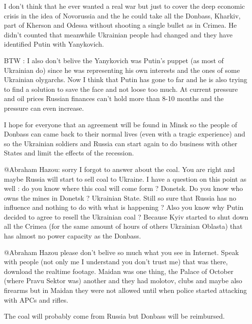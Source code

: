 \begin{itemize}
\begin{itemize}
I don't think that he ever wanted a real war but just to cover the deep
economic crisis in the idea of Novorussia and the he could take all the
Donbass, Kharkiv, part of Kherson and Odessa without shooting a single bullet
as in Crimea. He didn't counted that meanwhile Ukrainian people had changed and
they have identified Putin with Yanykovich.

BTW : I also don't belive the Yanykovich was Putin's puppet (as most of
Ukrainian do) since he was representing his own interests and the ones of some
Ukrainian olygarchs. Now I think that Putin has gone to far and he is also
trying to find a solution to save the face and not loose too much. At current
pressure and oil prices Russian finances can't hold more than 8-10 months and
the pressure can even increase. 

I hope for everyone that an agreement will be found in Minsk so the people of
Donbass can came back to their normal lives (even with a tragic experience) and
so the Ukrainian soldiers and Russia can start again to do business with other
States and limit the effects of the recession.


@Abraham Hazou: sorry I forgot to answer about the coal. You are right and
maybe Russia will start to sell coal to Ukraine. I have a question on this
point as well : do you know where this coal will come form ? Donetsk. Do you
know who owns the mines in Donetsk ? Ukrainian State. Still so sure that Russia
has no influence and nothing to do with what is happening ? Also you know why
Putin decided to agree to resell the Ukrainian coal ? Because Kyiv started to
shut down all the Crimea (for the same amount of hours of others Ukrainian
Oblasta) that has almost no power capacity as the Donbass.



@Abraham Hazou please don't belive so much what you see in Internet. Speak with
people (not only me I understand you don't trust me) that was there, download
the realtime footage. Maidan was one thing, the Palace of October (where Pravu
Sektor was) another and they had molotov, clubs and maybe also firearms but in
Maidan they were not allowed until when police started attacking with APCs and
rifles.


The coal will probably come from Russia but Donbass will be reimbursed.



\end{itemize}
\end{itemize}
